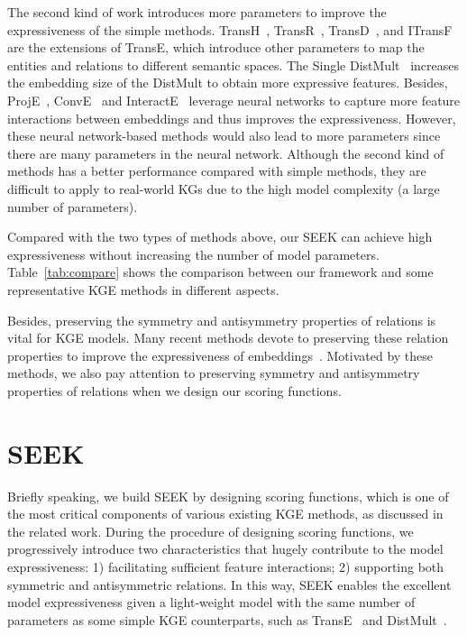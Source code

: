 \documentclass[11pt,a4paper]{article}
\begin{document}
The second kind of work introduces more parameters to improve the expressiveness of the simple methods. TransH~\cite{wang2014knowledge}, TransR~\cite{lin2015learning}, TransD~\cite{ji2015knowledge}, and ITransF~\cite{xie2017interpretable} are the extensions of TransE, which introduce other parameters to map the entities and relations to different semantic spaces. The Single DistMult~\cite{kadlec2017knowledge} increases the embedding size of the DistMult to obtain more expressive features. Besides, ProjE~\cite{shi2017proje}, ConvE~\cite{dettmers2018conve} and InteractE~\cite{vashishth2019interacte} leverage neural networks to capture more feature interactions between embeddings and thus improves the expressiveness. However, these neural network-based methods would also lead to more parameters since there are many parameters in the neural network. Although the second kind of methods has a better performance compared with simple methods, they are difficult to apply to real-world KGs due to the high model complexity (a large number of parameters).

Compared with the two types of methods above, our SEEK can achieve high expressiveness without increasing the number of model parameters. Table~\ref{tab:compare} shows the comparison between our framework and some representative KGE methods in different aspects. 

Besides, preserving the symmetry and antisymmetry properties of relations is vital for KGE models. Many recent methods devote to preserving these relation properties to improve the expressiveness of embeddings~\cite{trouillon2016complex,nickel2016holographic,guo2018:RUGE, boyang2018:aer,kazemi2018simple,sun2018rotate,DBLP:conf/acl/XuL19}.  Motivated by these methods, we also pay attention to preserving symmetry and antisymmetry properties of relations when we design our scoring functions.
 \section{SEEK}
\label{sec:complex}



Briefly speaking, we build SEEK by designing scoring functions, which is one of the most critical components of various existing KGE methods, as discussed in the related work.
During the procedure of designing scoring functions, we progressively introduce two characteristics that hugely contribute to the model expressiveness:
1) facilitating sufficient feature interactions;
2) supporting both symmetric and antisymmetric relations.
In this way, SEEK enables the excellent model expressiveness given a light-weight model with the same number of parameters as some simple KGE counterparts, such as TransE~\cite{bordes2013translating} and DistMult~\cite{yang2015embedding}.
\end{document}
